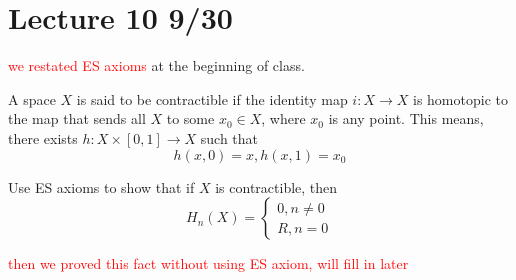 \section{Lecture 10 9/30}
\textcolor{red}{we restated ES axioms} at the beginning of class.
\begin{defn}[contractible]
    A space $X$ is said to be contractible if the identity map $i:X\to X$ is homotopic to the map that sends all $X$ to some $x_0\in X$, where $x_0$ is any point. This means, there exists $h:X\times [0,1]\to X$ such that 
    \begin{equation*}
        h(x,0)=x, h(x,1)=x_0
    \end{equation*}
\end{defn}
\begin{prob}
    Use ES axioms to show that if $X$ is contractible, then 
    \begin{equation*}
        H_n(X)=\begin{cases}
            0, n\neq 0\\
            R, n=0
        \end{cases}
    \end{equation*}
\end{prob}
\textcolor{red}{then we proved this fact without using ES axiom, will fill in later}


